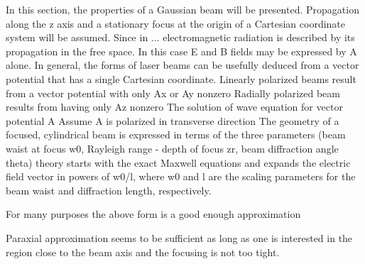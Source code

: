 In this section, the properties of a Gaussian beam will be presented.
Propagation along the z axis and a stationary
focus at the origin of a Cartesian coordinate system will be
assumed.
Since in ... electromagnetic radiation is described by its propagation in the free space.
In this case E and B fields may be expressed by A alone. 
In general, the forms of laser beams can be usefully deduced from a vector potential that
has a single Cartesian coordinate.
Linearly polarized beams result from a vector potential with only Ax or Ay nonzero
Radially polarized beam results from having only Az nonzero
The solution of wave equation for vector potential A
Assume A is polarized in transverse direction 
The geometry of a focused, cylindrical beam is expressed in terms
of the three parameters (beam waist at focus w0, Rayleigh range - depth of focus zr, beam diffraction angle theta)
theory starts with the exact Maxwell equations and expands the electric field vector in powers of w0/l, where w0 and l are the scaling parameters for the beam waist and diffraction length, respectively.

For many purposes the above form is a good enough approximation

Paraxial approximation seems to be sufficient as long as one is interested in the region close to the beam axis and the focusing is not too tight.